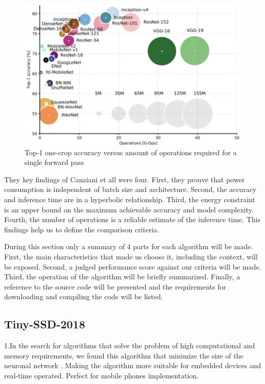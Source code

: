 \documentclass[10pt]{article}
\begin{document}
\begin{figure}[H]
  	\centering
    \includegraphics[scale=0.7]{codesComparation.PNG}
    \caption{Top-1 one-crop accuracy versus amount of operations required for a single forward pass \cite{canziani2016analysis}}
\end{figure} 

They key findings of Canziani et all were four. First, they prouve that power consumption is independent of batch size and architecture. Second, the accuracy and inference time are in a hyperbolic relationship. Third, the energy constraint is an upper bound on the maximum achievable accuracy and model complexity. Fourth, the number of operations is a reliable estimate of the inference time. 
This findings help us to define the comparison criteria.

During this section only a summary of 4 parts for each algorithm will be made. First, the main characteristics that made us choose it, including the context, will be exposed. Second, a judged performance score against our criteria will be made. Third, the operation of the algorithm will be briefly summarized. Finally, a reference to the source code will be presented and the requirements for downloading and compiling the code will be listed.\\

\subsection{Tiny-SSD-2018}
1.In the search for algorithms that solve the problem of high computational and memory requirements, we found this algorithm that minimize the size of the neuronal network . Making the algorithm more suitable for embedded devices and real-time operated. Perfect for mobile phones implementation.\cite{wong2018tiny}
\end{document}
